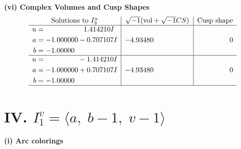 \documentclass[1p]{elsarticle_modified}
\theoremstyle{definition}
\newcommand{\I}{\sqrt{-1}}
\begin{document}
\newpage\flushleft \textbf{(vi) Complex Volumes and Cusp Shapes}
$$\begin{array}{c|c|c}  
\text{Solutions to }I^u_{3}& \I (\text{vol} + \sqrt{-1}CS) & \text{Cusp shape}\\
 \hline 
\begin{aligned}
u &= \phantom{-0.000000 -}1.414210 I \\
a &= -1.000000 - 0.707107 I \\
b &= -1.00000\phantom{ +0.000000I}\end{aligned}
 & -4.93480\phantom{ +0.000000I} & \phantom{-0.000000 } 0 \\ \hline\begin{aligned}
u &= \phantom{-0.000000 } -1.414210 I \\
a &= -1.000000 + 0.707107 I \\
b &= -1.00000\phantom{ +0.000000I}\end{aligned}
 & -4.93480\phantom{ +0.000000I} & \phantom{-0.000000 } 0\\
 \hline 
 \end{array}$$\newpage\newpage\renewcommand{\arraystretch}{1}
\centering \section*{IV. $I^v_{1}= \langle a,\;b-1,\;v-1 \rangle$}
\flushleft \textbf{(i) Arc colorings}\\
\end{document}
